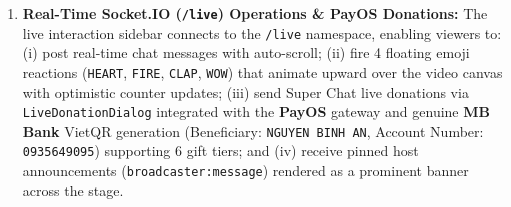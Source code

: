 {\begin{enumerate}[leftmargin=*,itemsep=2pt]
  \item \textbf{Real-Time Socket.IO (\texttt{/live}) Operations \& PayOS Donations:} The live interaction sidebar connects to the \texttt{/live} namespace, enabling viewers to: (i) post real-time chat messages with auto-scroll; (ii) fire 4 floating emoji reactions (\texttt{HEART}, \texttt{FIRE}, \texttt{CLAP}, \texttt{WOW}) that animate upward over the video canvas with optimistic counter updates; (iii) send Super Chat live donations via \texttt{LiveDonationDialog} integrated with the \textbf{PayOS} gateway and genuine \textbf{MB Bank} VietQR generation (Beneficiary: \texttt{NGUYEN BINH AN}, Account Number: \texttt{0935649095}) supporting 6 gift tiers; and (iv) receive pinned host announcements (\texttt{broadcaster:message}) rendered as a prominent banner across the stage.
\end{enumerate}
}

\subsection{}

